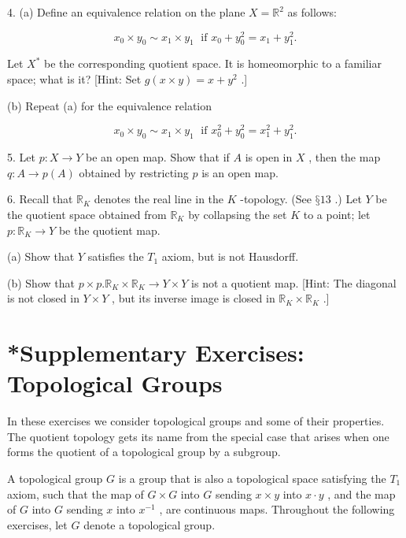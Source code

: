 4. (a) Define an equivalence relation on the plane \(X = {\mathbb{R}}^{2}\) as follows:

\[
{x}_{0} \times  {y}_{0} \sim  {x}_{1} \times  {y}_{1}\;\text{ if }{x}_{0} + {y}_{0}^{2} = {x}_{1} + {y}_{1}^{2}.
\]

Let \({X}^{ * }\) be the corresponding quotient space. It is homeomorphic to a familiar space; what is it? [Hint: Set \(g\left( {x \times  y}\right)  = x + {y}^{2}\) .]

(b) Repeat (a) for the equivalence relation

\[
{x}_{0} \times  {y}_{0} \sim  {x}_{1} \times  {y}_{1}\;\text{ if }{x}_{0}^{2} + {y}_{0}^{2} = {x}_{1}^{2} + {y}_{1}^{2}.
\]

5. Let \(p : X \rightarrow  Y\) be an open map. Show that if \(A\) is open in \(X\) , then the map \(q : A \rightarrow  p\left( A\right)\) obtained by restricting \(p\) is an open map.

6. Recall that \({\mathbb{R}}_{K}\) denotes the real line in the \(K\) -topology. (See \(§{13}\) .) Let \(Y\) be the quotient space obtained from \({\mathbb{R}}_{K}\) by collapsing the set \(K\) to a point; let \(p : {\mathbb{R}}_{K} \rightarrow  Y\) be the quotient map.

(a) Show that \(Y\) satisfies the \({T}_{1}\) axiom, but is not Hausdorff.

(b) Show that \(p \times  p.{\mathbb{R}}_{K} \times  {\mathbb{R}}_{K} \rightarrow  Y \times  Y\) is not a quotient map. [Hint: The diagonal is not closed in \(Y \times  Y\) , but its inverse image is closed in \({\mathbb{R}}_{K} \times  {\mathbb{R}}_{K}\) .]

\section*{*Supplementary Exercises: Topological Groups}

In these exercises we consider topological groups and some of their properties. The quotient topology gets its name from the special case that arises when one forms the quotient of a topological group by a subgroup.

A topological group \(G\) is a group that is also a topological space satisfying the \({T}_{1}\) axiom, such that the map of \(G \times  G\) into \(G\) sending \(x \times  y\) into \(x \cdot  y\) , and the map of \(G\) into \(G\) sending \(x\) into \({x}^{-1}\) , are continuous maps. Throughout the following exercises, let \(G\) denote a topological group.


